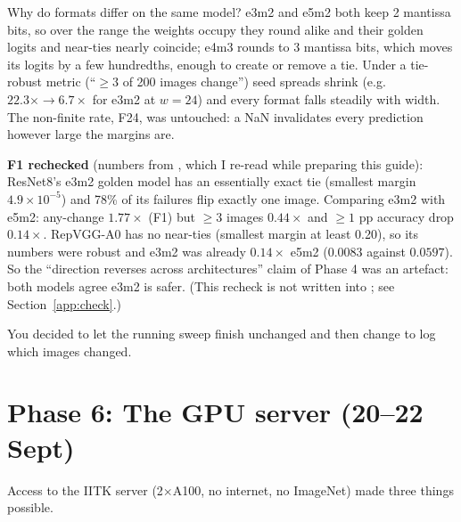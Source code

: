 Why do formats differ on the same model? e3m2 and e5m2 both keep 2 mantissa bits, so over the range the weights occupy they round alike and their golden logits and near-ties nearly coincide; e4m3 rounds to 3 mantissa bits, which moves its logits by a few hundredths, enough to create or remove a tie.
Under a tie-robust metric (``$\ge3$ of 200 images change'') seed spreads shrink (e.g.\ $22.3\times\to6.7\times$ for e3m2 at $w=24$) and every format falls steadily with width. The non-finite rate, F24, was untouched: a NaN invalidates every prediction however large the margins are.

\textbf{F1 rechecked} (numbers from , which I re-read while preparing this guide): ResNet8's e3m2 golden model has an essentially exact tie (smallest margin $4.9\times10^{-5}$) and 78\% of its failures flip exactly one image. Comparing e3m2 with e5m2: any-change $1.77\times$ (F1) but $\ge3$ images $0.44\times$ and $\ge1$ pp accuracy drop $0.14\times$.
RepVGG-A0 has no near-ties (smallest margin at least 0.20), so its numbers were robust and e3m2 was already $0.14\times$ e5m2 ($0.0083$ against $0.0597$). So the ``direction reverses across architectures'' claim of Phase 4 was an artefact: both models agree e3m2 is safer. (This recheck is not written into ; see Section~\ref{app:check}.)

You decided to let the running sweep finish unchanged and then change  to log which images changed.

\section{Phase 6: The GPU server (20--22 Sept)}
Access to the IITK server (2$\times$A100, no internet, no ImageNet) made three things possible.

